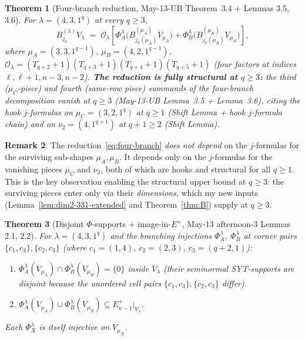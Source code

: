 \documentclass[11pt]{article}
\newtheorem{theorem}{Theorem}
\theoremstyle{definition}
\newtheorem{remark}[theorem]{Remark}
\begin{document}
\begin{theorem}[Four-branch reduction, May-13-UB Theorem~3.4 + Lemmas 3.5, 3.6]\label{thm:reduction}
For $\lambda = (4, 3, 1^q)$ at every $q \ge 3$,
\begin{equation}\label{eq:four-branch}
   B^{(\lambda)}_{j_0} V_\lambda
   \;=\;
   \mathcal{O}_\lambda\!\left[
     \Phi_A^\lambda\!\big(B^{(\mu_A)}_{j_0(\mu_A)} V_{\mu_A}\big)
     +
     \Phi_B^\lambda\!\big(B^{(\mu_B)}_{j_0(\mu_B)} V_{\mu_B}\big)
   \right],
\end{equation}
where $\mu_A = (3, 3, 1^{q-1})$, $\mu_B = (4, 2, 1^{q-1})$,
$\mathcal{O}_\lambda = (T_{q+2}{+}1)(T_{q+3}{+}1)(T_{q+4}{+}1)(T_{q+5}{+}1)$
(four factors at indices $\ell, \ell+1, n-3, n-2$).
\textbf{The reduction is fully structural at $q \ge 3$:} the third
($\mu_C$-piece) and fourth (same-row piece) summands of the four-branch
decomposition vanish at $q \ge 3$ (May-13-UB Lemma~3.5 + Lemma~3.6),
citing the hook $j$-formulas on $\mu_C = (3, 2, 1^q)$ at $q \ge 1$
(Shift Lemma + hook $j$-formula chain) and on $\nu_2 = (4, 1^{q+1})$
at $q + 1 \ge 2$ (Shift Lemma).
\end{theorem}

\begin{remark}\label{rem:reduction-no-mu-j-needed}
The reduction~\eqref{eq:four-branch} \emph{does not depend} on the
$j$-formulas for the surviving sub-shapes $\mu_A, \mu_B$. It depends
only on the $j$-formulas for the vanishing pieces $\mu_C$ and
$\nu_2$, both of which are hooks and structural for all $q \ge 1$.
This is the key observation enabling the structural upper bound at
$q \ge 3$: the surviving pieces enter only via their \emph{dimensions},
which my new inputs (Lemma~\ref{lem:dim2-331-extended} and
Theorem~\ref{thm:B}) supply at $q \ge 3$.
\end{remark}

\begin{theorem}[Disjoint $\Phi$-supports + image-in-$E^+$, May-13 afternoon-3 Lemmas 2.1, 2.2]\label{thm:disjoint-image}
For $\lambda = (4, 3, 1^q)$ and the branching injections $\Phi_A^\lambda$,
$\Phi_B^\lambda$ at corner pairs $\{c_1, c_3\}, \{c_2, c_3\}$
(where $c_1 = (1, 4)$, $c_2 = (2, 3)$, $c_3 = (q+2, 1)$):
\begin{enumerate}[leftmargin=2em,topsep=0.2em,itemsep=0.1em]
\item $\Phi_A^\lambda(V_{\mu_A}) \cap \Phi_B^\lambda(V_{\mu_B}) = \{0\}$
inside $V_\lambda$ (their seminormal SYT-supports are disjoint
because the unordered cell pairs $\{c_1, c_3\}, \{c_2, c_3\}$
differ).
\item $\Phi_A^\lambda(V_{\mu_A}) \cup \Phi_B^\lambda(V_{\mu_B})
\subseteq E_{n-1}^+|_{V_\lambda}$.
\end{enumerate}
Each $\Phi_X^\lambda$ is itself injective on $V_{\mu_X}$.
\end{theorem}
\end{document}
